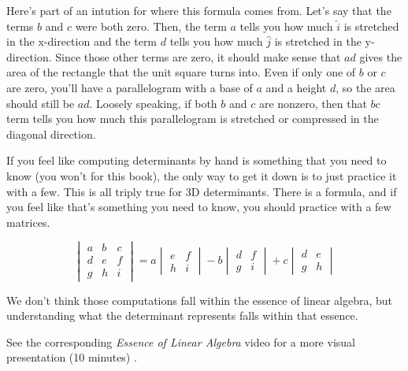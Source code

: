 Here's part of an intution for where this formula comes from. Let's say that the
terms $b$ and $c$ were both zero. Then, the term $a$ tells you how much
$\hat{i}$ is stretched in the x-direction and the term $d$ tells you how much
$\hat{j}$ is stretched in the y-direction. Since those other terms are zero, it
should make sense that $ad$ gives the area of the rectangle that the unit square
turns into. Even if only one of $b$ or $c$ are zero, you'll have a parallelogram
with a base of $a$ and a height $d$, so the area should still be $ad$. Loosely
speaking, if both $b$ and $c$ are nonzero, then that $bc$ term tells you how
much this parallelogram is stretched or compressed in the diagonal direction.

If you feel like computing determinants by hand is something that you need to
know (you won't for this book), the only way to get it down is to just practice
it with a few. This is all triply true for 3D determinants. There is a formula,
and if you feel like that's something you need to know, you should practice with
a few matrices.

\begin{equation*}
  \begin{vmatrix}
    a & b & c \\
    d & e & f \\
    g & h & i
  \end{vmatrix} =
  a \begin{vmatrix}
    e & f \\
    h & i
  \end{vmatrix}
  - b \begin{vmatrix}
    d & f \\
    g & i
  \end{vmatrix}
  + c \begin{vmatrix}
    d & e \\
    g & h
  \end{vmatrix}
\end{equation*}

We don't think those computations fall within the essence of linear algebra, but
understanding what the determinant represents falls within that essence.

\begin{remark}
  See the corresponding \textit{Essence of Linear Algebra} video for a more
  visual presentation (10 minutes) \cite{bib:linalg_the_determinant}.
\end{remark}

